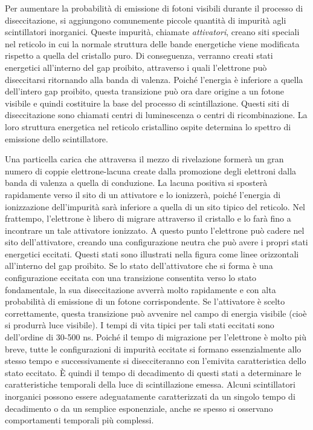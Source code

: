 Per aumentare la probabilità di emissione di fotoni visibili durante il processo di diseccitazione, si aggiungono comunemente piccole quantità di impurità agli scintillatori inorganici. Queste impurità, chiamate \textit{attivatori}, creano siti speciali nel reticolo in cui la normale struttura delle bande energetiche viene modificata rispetto a quella del cristallo puro. Di conseguenza, verranno creati stati energetici all'interno del gap proibito, attraverso i quali l'elettrone può diseccitarsi ritornando alla banda di valenza. Poiché l'energia è inferiore a quella dell'intero gap proibito, questa transizione può ora dare origine a un fotone visibile e quindi costituire la base del processo di scintillazione. Questi siti di diseccitazione sono chiamati centri di luminescenza o centri di ricombinazione. La loro struttura energetica nel reticolo cristallino ospite determina lo spettro di emissione dello scintillatore.

Una particella carica che attraversa il mezzo di rivelazione formerà un gran numero di coppie elettrone-lacuna create dalla promozione degli elettroni dalla banda di valenza a quella di conduzione. La lacuna positiva si sposterà rapidamente verso il sito di un attivatore e lo ionizzerà, poiché l'energia di ionizzazione dell'impurità sarà inferiore a quella di un sito tipico del reticolo. Nel frattempo, l'elettrone è libero di migrare attraverso il cristallo e lo farà fino a incontrare un tale attivatore ionizzato. A questo punto l'elettrone può cadere nel sito dell'attivatore, creando una configurazione neutra che può avere i propri stati energetici eccitati. Questi stati sono illustrati nella figura come linee orizzontali all'interno del gap proibito. Se lo stato dell'attivatore che si forma è una configurazione eccitata con una transizione consentita verso lo stato fondamentale, la sua diseccitazione avverrà molto rapidamente e con alta probabilità di emissione di un fotone corrispondente. Se l'attivatore è scelto correttamente, questa transizione può avvenire nel campo di energia visibile (cioè si produrrà luce visibile). I tempi di vita tipici per tali stati eccitati sono dell'ordine di 30-500 ns. Poiché il tempo di migrazione per l'elettrone è molto più breve, tutte le configurazioni di impurità eccitate si formano essenzialmente allo stesso tempo e successivamente si disecciteranno con l'emivita caratteristica dello stato eccitato. È quindi il tempo di decadimento di questi stati a determinare le caratteristiche temporali della luce di scintillazione emessa. Alcuni scintillatori inorganici possono essere adeguatamente caratterizzati da un singolo tempo di decadimento o da un semplice esponenziale, anche se spesso si osservano comportamenti temporali più complessi.

